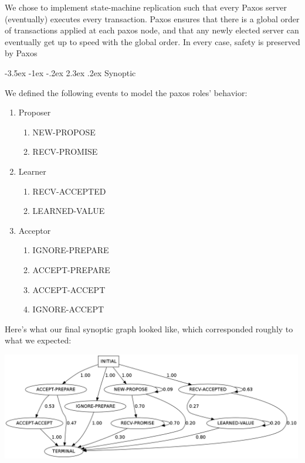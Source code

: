 \documentclass[12pt]{article}
\makeatletter
\renewcommand\section{\@startsection{section}{1}{\z@}%
								 {-3.5ex \@plus -1ex \@minus -.2ex}%
								 {2.3ex \@plus.2ex}%
								 {\normalfont\large\bfseries}}
\makeatother
\begin{document}
We chose to implement state-machine replication such that every Paxos server (eventually)
executes every transaction. Paxos ensures that there is a global order of transactions
applied at each paxos node, and that any newly elected server can eventually get up to
speed with the global order. In every case, safety is preserved by Paxos %

\section{Synoptic}

We defined the following events to model the paxos roles' behavior:

\begin{enumerate}
\item Proposer
    \begin{enumerate}
        \item \textsc{NEW-PROPOSE}
        \item \textsc{RECV-PROMISE}
     \end{enumerate}
\item Learner
    \begin{enumerate}
        \item \textsc{RECV-ACCEPTED}
        \item \textsc{LEARNED-VALUE}
    \end{enumerate}
\item Acceptor
    \begin{enumerate}
        \item \textsc{IGNORE-PREPARE}
        \item \textsc{ACCEPT-PREPARE}
        \item \textsc{ACCEPT-ACCEPT}
        \item \textsc{IGNORE-ACCEPT}
    \end{enumerate}
\end{enumerate}

Here's what our final synoptic graph looked like, which corresponded roughly to what
we expected:

\begin{center}
    \includegraphics[width=500px]{synopticOutProj4.png}
\end{center}
\end{document}

